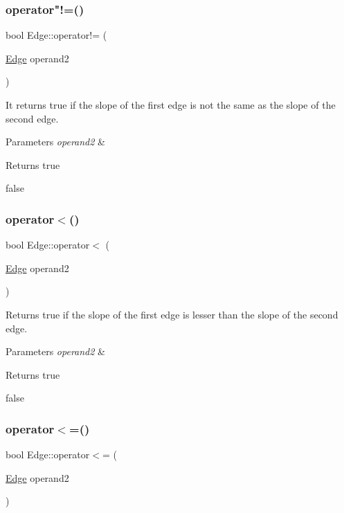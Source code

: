 \subsubsection{\texorpdfstring{operator"!=()}{operator!=()}}
{\footnotesize\ttfamily bool Edge\+::operator!= (\begin{DoxyParamCaption}\item[{\hyperlink{classEdge}{Edge}}]{operand2 }\end{DoxyParamCaption})}



It returns true if the slope of the first edge is not the same as the slope of the second edge. 


\begin{DoxyParams}{Parameters}
{\em operand2} & \\
\hline
\end{DoxyParams}
\begin{DoxyReturn}{Returns}
true 

false 
\end{DoxyReturn}
\mbox{\label{classEdge_a1144b2120acd52fb6ca2a7374ad1edd5}} 
\subsubsection{\texorpdfstring{operator$<$()}{operator<()}}
{\footnotesize\ttfamily bool Edge\+::operator$<$ (\begin{DoxyParamCaption}\item[{\hyperlink{classEdge}{Edge}}]{operand2 }\end{DoxyParamCaption})}



Returns true if the slope of the first edge is lesser than the slope of the second edge. 


\begin{DoxyParams}{Parameters}
{\em operand2} & \\
\hline
\end{DoxyParams}
\begin{DoxyReturn}{Returns}
true 

false 
\end{DoxyReturn}
\mbox{\label{classEdge_a60d555298a70e0fa4c75705d09386cc2}} 
\subsubsection{\texorpdfstring{operator$<$=()}{operator<=()}}
{\footnotesize\ttfamily bool Edge\+::operator$<$= (\begin{DoxyParamCaption}\item[{\hyperlink{classEdge}{Edge}}]{operand2 }\end{DoxyParamCaption})}



